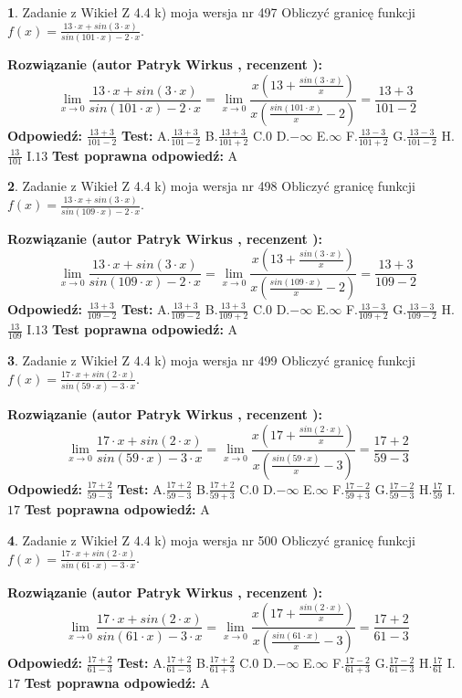 \documentclass[12pt, a4paper]{article}
\theoremstyle{definition} %
\newtheorem{zad}{}
\newcommand{\zadStart}[1]{\begin{zad}#1\newline}
\newcommand{\zadStop}{\end{zad}}
\newcommand{\rozwStart}[2]{\noindent \textbf{Rozwiązanie (autor #1 , recenzent #2): }\newline}
\newcommand{\rozwStop}{\newline}
\newcommand{\odpStart}{\noindent \textbf{Odpowiedź:}\newline}
\newcommand{\odpStop}{\newline}
\newcommand{\testStart}{\noindent \textbf{Test:}\newline}
\newcommand{\testStop}{\newline}
\newcommand{\kluczStart}{\noindent \textbf{Test poprawna odpowiedź:}\newline}
\newcommand{\kluczStop}{\newline}
\begin{document}
\zadStart{Zadanie z Wikieł Z 4.4 k) moja wersja nr 497}
Obliczyć granicę funkcji $f(x)=\frac{13\cdot x +sin(3\cdot x)}{sin(101\cdot x) -2\cdot x}$.
\zadStop
\rozwStart{Patryk Wirkus}{}
$$\lim\limits_{x\to 0}\frac{13\cdot x +sin(3\cdot x)}{sin(101\cdot x) -2\cdot x}
=\lim\limits_{x\to 0}\frac{x(13+\frac{sin(3\cdot x)}{x})}{x(\frac{sin(101\cdot x)}{x}-2)}
=\frac{13+3}{101-2}$$
\rozwStop
\odpStart
$\frac{13+3}{101-2}$
\odpStop
\testStart
A.$\frac{13+3}{101-2}$
B.$\frac{13+3}{101+2}$
C.$0$
D.$-\infty$
E.$\infty$
F.$\frac{13-3}{101+2}$
G.$\frac{13-3}{101-2}$
H.$\frac{13}{101}$
I.$13$
\testStop
\kluczStart
A
\kluczStop



\zadStart{Zadanie z Wikieł Z 4.4 k) moja wersja nr 498}
Obliczyć granicę funkcji $f(x)=\frac{13\cdot x +sin(3\cdot x)}{sin(109\cdot x) -2\cdot x}$.
\zadStop
\rozwStart{Patryk Wirkus}{}
$$\lim\limits_{x\to 0}\frac{13\cdot x +sin(3\cdot x)}{sin(109\cdot x) -2\cdot x}
=\lim\limits_{x\to 0}\frac{x(13+\frac{sin(3\cdot x)}{x})}{x(\frac{sin(109\cdot x)}{x}-2)}
=\frac{13+3}{109-2}$$
\rozwStop
\odpStart
$\frac{13+3}{109-2}$
\odpStop
\testStart
A.$\frac{13+3}{109-2}$
B.$\frac{13+3}{109+2}$
C.$0$
D.$-\infty$
E.$\infty$
F.$\frac{13-3}{109+2}$
G.$\frac{13-3}{109-2}$
H.$\frac{13}{109}$
I.$13$
\testStop
\kluczStart
A
\kluczStop



\zadStart{Zadanie z Wikieł Z 4.4 k) moja wersja nr 499}
Obliczyć granicę funkcji $f(x)=\frac{17\cdot x +sin(2\cdot x)}{sin(59\cdot x) -3\cdot x}$.
\zadStop
\rozwStart{Patryk Wirkus}{}
$$\lim\limits_{x\to 0}\frac{17\cdot x +sin(2\cdot x)}{sin(59\cdot x) -3\cdot x}
=\lim\limits_{x\to 0}\frac{x(17+\frac{sin(2\cdot x)}{x})}{x(\frac{sin(59\cdot x)}{x}-3)}
=\frac{17+2}{59-3}$$
\rozwStop
\odpStart
$\frac{17+2}{59-3}$
\odpStop
\testStart
A.$\frac{17+2}{59-3}$
B.$\frac{17+2}{59+3}$
C.$0$
D.$-\infty$
E.$\infty$
F.$\frac{17-2}{59+3}$
G.$\frac{17-2}{59-3}$
H.$\frac{17}{59}$
I.$17$
\testStop
\kluczStart
A
\kluczStop



\zadStart{Zadanie z Wikieł Z 4.4 k) moja wersja nr 500}
Obliczyć granicę funkcji $f(x)=\frac{17\cdot x +sin(2\cdot x)}{sin(61\cdot x) -3\cdot x}$.
\zadStop
\rozwStart{Patryk Wirkus}{}
$$\lim\limits_{x\to 0}\frac{17\cdot x +sin(2\cdot x)}{sin(61\cdot x) -3\cdot x}
=\lim\limits_{x\to 0}\frac{x(17+\frac{sin(2\cdot x)}{x})}{x(\frac{sin(61\cdot x)}{x}-3)}
=\frac{17+2}{61-3}$$
\rozwStop
\odpStart
$\frac{17+2}{61-3}$
\odpStop
\testStart
A.$\frac{17+2}{61-3}$
B.$\frac{17+2}{61+3}$
C.$0$
D.$-\infty$
E.$\infty$
F.$\frac{17-2}{61+3}$
G.$\frac{17-2}{61-3}$
H.$\frac{17}{61}$
I.$17$
\testStop
\kluczStart
A
\kluczStop
\end{document}
